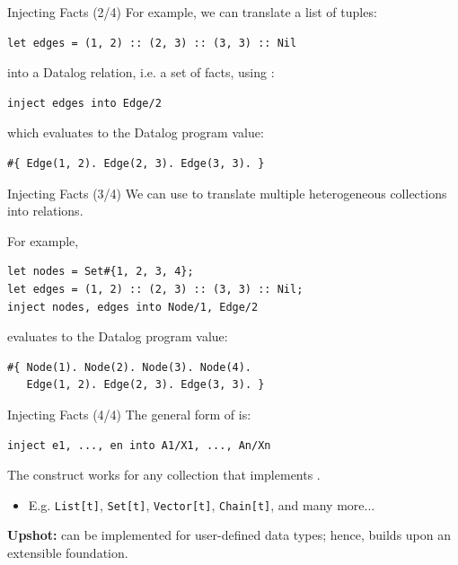 \begin{frame}[fragile]{Injecting Facts (2/4)}
For example, we can translate a list of tuples:

\begin{lstlisting}[language=flix, xleftmargin=0.8cm]
let edges = (1, 2) :: (2, 3) :: (3, 3) :: Nil
\end{lstlisting}

into a Datalog relation, i.e. a set of facts, using :

\begin{lstlisting}[language=flix, xleftmargin=0.8cm]
inject edges into Edge/2
\end{lstlisting}

which evaluates to the Datalog program value:

\begin{lstlisting}[language=flix, xleftmargin=0.8cm]
#{ Edge(1, 2). Edge(2, 3). Edge(3, 3). }
\end{lstlisting}
\end{frame}

\begin{frame}[fragile]{Injecting Facts (3/4)}
We can use  to translate multiple heterogeneous collections into
relations.

For example, 

\begin{lstlisting}[language=flix, xleftmargin=0.8cm]
let nodes = Set#{1, 2, 3, 4};
let edges = (1, 2) :: (2, 3) :: (3, 3) :: Nil;
inject nodes, edges into Node/1, Edge/2
\end{lstlisting}

evaluates to the Datalog program value:

\begin{lstlisting}[language=flix, xleftmargin=0.8cm]
#{ Node(1). Node(2). Node(3). Node(4). 
   Edge(1, 2). Edge(2, 3). Edge(3, 3). }
\end{lstlisting}
\end{frame}

\begin{frame}[fragile]{Injecting Facts (4/4)}
The general form of  is:

\begin{lstlisting}[language=flix, xleftmargin=0.8cm]
inject e1, ..., en into A1/X1, ..., An/Xn
\end{lstlisting}

The  construct works for any collection that implements
. 

\begin{itemize}
    \item E.g. \texttt{List[t]}, \texttt{Set[t]}, \texttt{Vector[t]}, \texttt{Chain[t]}, and many more...
\end{itemize}

\pause

\textbf{Upshot:}  can be implemented for user-defined data
types; hence,  builds upon an extensible foundation.
\end{frame}


